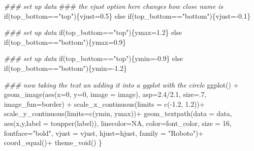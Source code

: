 \documentclass[
  letterpaper,
]{krantz}
\newenvironment{Shaded}{\begin{snugshade}}{\end{snugshade}}
\newcommand{\AlertTok}[1]{\textcolor[rgb]{0.68,0.00,0.00}{#1}}
\newcommand{\AttributeTok}[1]{\textcolor[rgb]{0.40,0.45,0.13}{#1}}
\newcommand{\ConstantTok}[1]{\textcolor[rgb]{0.56,0.35,0.01}{#1}}
\newcommand{\ControlFlowTok}[1]{\textcolor[rgb]{0.00,0.23,0.31}{#1}}
\newcommand{\DecValTok}[1]{\textcolor[rgb]{0.68,0.00,0.00}{#1}}
\newcommand{\DocumentationTok}[1]{\textcolor[rgb]{0.37,0.37,0.37}{\textit{#1}}}
\newcommand{\FloatTok}[1]{\textcolor[rgb]{0.68,0.00,0.00}{#1}}
\newcommand{\FunctionTok}[1]{\textcolor[rgb]{0.28,0.35,0.67}{#1}}
\newcommand{\NormalTok}[1]{\textcolor[rgb]{0.00,0.23,0.31}{#1}}
\newcommand{\OtherTok}[1]{\textcolor[rgb]{0.00,0.23,0.31}{#1}}
\newcommand{\SpecialCharTok}[1]{\textcolor[rgb]{0.37,0.37,0.37}{#1}}
\newcommand{\StringTok}[1]{\textcolor[rgb]{0.13,0.47,0.30}{#1}}
\begin{document}
\begin{Shaded}
\begin{Highlighting}[]
  \DocumentationTok{\#\#\# set up data   }\AlertTok{\#\#\#}\DocumentationTok{ the \textasciigrave{}vjust\textasciigrave{} option here changes how close name is}
  \ControlFlowTok{if}\NormalTok{(top\_bottom}\SpecialCharTok{==}\StringTok{"top"}\NormalTok{)\{vjust}\OtherTok{=}\FloatTok{0.5}\NormalTok{\}}
  \ControlFlowTok{else} \ControlFlowTok{if}\NormalTok{(top\_bottom}\SpecialCharTok{==}\StringTok{"bottom"}\NormalTok{)\{vjust}\OtherTok{=}\SpecialCharTok{{-}}\FloatTok{0.1}\NormalTok{\}}
  
  \DocumentationTok{\#\#\# set up data}
  \ControlFlowTok{if}\NormalTok{(top\_bottom}\SpecialCharTok{==}\StringTok{"top"}\NormalTok{)\{ymax}\OtherTok{=}\FloatTok{1.2}\NormalTok{\}}
  \ControlFlowTok{else} \ControlFlowTok{if}\NormalTok{(top\_bottom}\SpecialCharTok{==}\StringTok{"bottom"}\NormalTok{)\{ymax}\OtherTok{=}\FloatTok{0.9}\NormalTok{\}}
  
  \DocumentationTok{\#\#\# set up data}
  \ControlFlowTok{if}\NormalTok{(top\_bottom}\SpecialCharTok{==}\StringTok{"top"}\NormalTok{)\{ymin}\OtherTok{=}\SpecialCharTok{{-}}\FloatTok{0.9}\NormalTok{\}}
  \ControlFlowTok{else} \ControlFlowTok{if}\NormalTok{(top\_bottom}\SpecialCharTok{==}\StringTok{"bottom"}\NormalTok{)\{ymin}\OtherTok{=}\SpecialCharTok{{-}}\FloatTok{1.2}\NormalTok{\}}
  
  \DocumentationTok{\#\#\# now taking the text an adding it into a ggplot with the circle}
  \FunctionTok{ggplot}\NormalTok{() }\SpecialCharTok{+}
    \FunctionTok{geom\_image}\NormalTok{(}\FunctionTok{aes}\NormalTok{(}\AttributeTok{x=}\DecValTok{0}\NormalTok{, }\AttributeTok{y=}\DecValTok{0}\NormalTok{, }\AttributeTok{image =}\NormalTok{ image), }\AttributeTok{asp=}\FloatTok{2.4}\SpecialCharTok{/}\FloatTok{2.1}\NormalTok{,}
               \AttributeTok{size=}\NormalTok{.}\DecValTok{7}\NormalTok{, }\AttributeTok{image\_fun=}\NormalTok{border) }\SpecialCharTok{+}
    \FunctionTok{scale\_x\_continuous}\NormalTok{(}\AttributeTok{limits =} \FunctionTok{c}\NormalTok{(}\SpecialCharTok{{-}}\FloatTok{1.2}\NormalTok{, }\FloatTok{1.2}\NormalTok{))}\SpecialCharTok{+}
    \FunctionTok{scale\_y\_continuous}\NormalTok{(}\AttributeTok{limits=}\FunctionTok{c}\NormalTok{(ymin, ymax))}\SpecialCharTok{+}
    \FunctionTok{geom\_textpath}\NormalTok{(}\AttributeTok{data =}\NormalTok{ data, }\FunctionTok{aes}\NormalTok{(x,y,}\AttributeTok{label =} \FunctionTok{toupper}\NormalTok{(label)),}
                  \AttributeTok{linecolor=}\ConstantTok{NA}\NormalTok{, }\AttributeTok{color=}\NormalTok{font\_color,}
                  \AttributeTok{size =} \DecValTok{16}\NormalTok{,  }\AttributeTok{fontface=}\StringTok{"bold"}\NormalTok{,}
                  \AttributeTok{vjust =}\NormalTok{ vjust, }\AttributeTok{hjust=}\NormalTok{hjust, }\AttributeTok{family =} \StringTok{"Roboto"}\NormalTok{)}\SpecialCharTok{+}
    \FunctionTok{coord\_equal}\NormalTok{()}\SpecialCharTok{+}
    \FunctionTok{theme\_void}\NormalTok{()}
\NormalTok{\}}
\end{Highlighting}
\end{Shaded}
\end{document}
